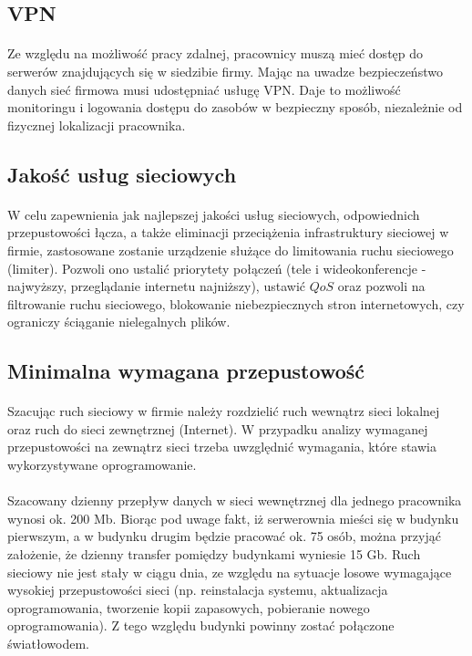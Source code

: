 \subsection{VPN}
\paragraph{}
Ze względu na możliwość pracy zdalnej, pracownicy muszą mieć dostęp do serwerów znajdujących się w siedzibie firmy. Mając na uwadze bezpieczeństwo danych sieć firmowa musi udostępniać usługę VPN. Daje to możliwość monitoringu i logowania dostępu do zasobów w bezpieczny sposób, niezależnie od fizycznej lokalizacji pracownika.

\subsection{Jakość usług sieciowych}
\paragraph{}
W celu zapewnienia jak najlepszej jakości usług sieciowych, odpowiednich przepustowości łącza, a także eliminacji przeciążenia infrastruktury sieciowej w firmie, zastosowane zostanie urządzenie służące do limitowania ruchu sieciowego (limiter). Pozwoli ono ustalić priorytety połączeń (tele i wideokonferencje - najwyższy, przeglądanie internetu najniższy), ustawić $QoS$ oraz pozwoli na filtrowanie ruchu sieciowego, blokowanie niebezpiecznych stron internetowych, czy ograniczy ściąganie nielegalnych plików.

\subsection{Minimalna wymagana przepustowość}
\paragraph{}
Szacując ruch sieciowy w firmie należy rozdzielić ruch wewnątrz sieci lokalnej oraz ruch do sieci zewnętrznej (Internet). W przypadku analizy wymaganej przepustowości na zewnątrz sieci trzeba uwzględnić wymagania, które stawia wykorzystywane oprogramowanie.

\paragraph{}
Szacowany dzienny przepływ danych w sieci wewnętrznej dla jednego pracownika wynosi ok. 200 Mb. 
Biorąc pod uwage fakt, iż serwerownia mieści się w budynku pierwszym, a w budynku drugim będzie pracować ok. 75 osób, można przyjąć założenie, że dzienny transfer pomiędzy budynkami wyniesie 15 Gb. 
Ruch sieciowy nie jest stały w ciągu dnia, ze względu na sytuacje losowe wymagające wysokiej przepustowości sieci (np. reinstalacja systemu, aktualizacja oprogramowania, tworzenie kopii zapasowych, pobieranie nowego oprogramowania). 
Z tego względu budynki powinny zostać połączone światłowodem.

